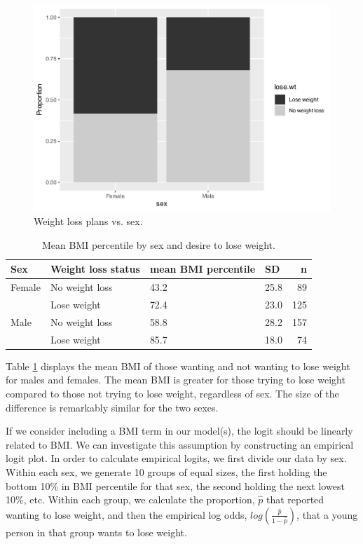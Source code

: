 \documentclass[
]{krantz}
\begin{document}
\begin{figure}

{\centering \includegraphics[width=0.6\linewidth]{bookdown-BeyondMLR_files/figure-latex/mosaicsexlose-1} 

}

\caption{Weight loss plans vs. sex.}\label{fig:mosaicsexlose}
\end{figure}

\begin{table}

\caption{\label{tab:table3chp6}Mean BMI percentile by sex and desire to lose weight.}
\centering
\begin{tabular}[t]{llllr}
\toprule
Sex & Weight loss status & mean BMI percentile & SD & n\\
\midrule
Female & No weight loss & 43.2 & 25.8 & 89\\
 & Lose weight & 72.4 & 23.0 & 125\\
Male & No weight loss & 58.8 & 28.2 & 157\\
 & Lose weight & 85.7 & 18.0 & 74\\
\bottomrule
\end{tabular}
\end{table}

Table \ref{tab:table3chp6} displays the mean BMI of those wanting and not wanting to lose weight for males and females. The mean BMI is greater for those trying to lose weight compared to those not trying to lose weight, regardless of sex. The size of the difference is remarkably similar for the two sexes.

If we consider including a BMI term in our model(s), the logit should be linearly related to BMI. We can investigate this assumption by constructing an empirical logit plot. In order to calculate empirical logits, we first divide our data by sex. Within each sex, we generate 10 groups of equal sizes, the first holding the bottom 10\% in BMI percentile for that sex, the second holding the next lowest 10\%, etc. Within each group, we calculate the proportion, \(\hat{p}\) that reported wanting to lose weight, and then the empirical log odds, \(log(\frac{\hat{p}}{1-\hat{p}})\), that a young person in that group wants to lose weight.
\end{document}
